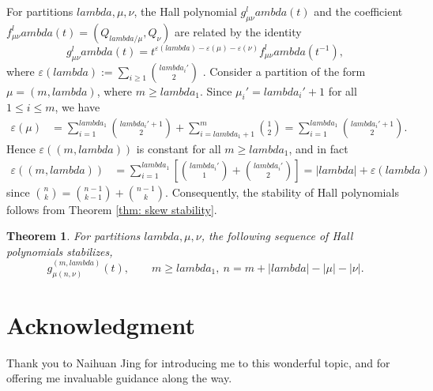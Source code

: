 \documentclass[12pt]{amsart}%
\def\lambda{lambda}%
\newtheorem{theorem}{Theorem}[section]
\theoremstyle{remark}
\theoremstyle{definition}
\begin{document}
    For partitions $\lambda,\mu,\nu$, the Hall polynomial $g_{\mu\nu}^\lambda(t)$ and the coefficient $f_{\mu\nu}^\lambda(t)=(Q_{\lambda/\mu},Q_\nu)$ are related by the identity
    \begin{equation*}
        g_{\mu\nu}^\lambda(t)=t^{\varepsilon(\lambda)-\varepsilon(\mu)-\varepsilon(\nu)}f_{\mu\nu}^\lambda(t^{-1}),
    \end{equation*}
    where $\varepsilon(\lambda):=\sum_{i\geq1}\binom{\lambda_i'}{2}$ \cite[p.~217]{macdonald:1995}. Consider a partition of the form $\mu=(m,\lambda)$, where $m\geq\lambda_1$. Since $\mu_i'=\lambda_i'+1$ for all $1\leq i\leq m$, we have
    \begin{align*}
        \varepsilon(\mu)&=\sum_{i=1}^{\lambda_1}\binom{\lambda_i'+1}{2}+\sum_{i=\lambda_1+1}^m\binom{1}{2}=\sum_{i=1}^{\lambda_1}\binom{\lambda_i'+1}{2}.
    \end{align*}
    Hence $\varepsilon((m,\lambda))$ is constant for all $m\geq\lambda_1$, and in fact
    \begin{align*}
        \varepsilon((m,\lambda))&=\sum_{i=1}^{\lambda_1}\left[\binom{\lambda_i'}{1}+\binom{\lambda_i'}{2}\right]=|\lambda|+\varepsilon(\lambda)
    \end{align*}
    since $\binom{n}{k}=\binom{n-1}{k-1}+\binom{n-1}{k}$. Consequently, the stability of Hall polynomials follows from Theorem \ref{thm: skew stability}.
    \begin{theorem}
        For partitions $\lambda,\mu,\nu$, the following sequence of Hall polynomials stabilizes, 
        \[g_{\mu(n,\nu)}^{(m,\lambda)}(t),\qquad m\geq\lambda_1,~n=m+|\lambda|-|\mu|-|\nu|.\]
    \end{theorem}

    \section*{Acknowledgment}

    Thank you to Naihuan Jing for introducing me to this wonderful topic, and for offering me invaluable guidance along the way.



    

    
    
    

    \bigskip
    \bigskip

    
    
    
    
\end{document}
